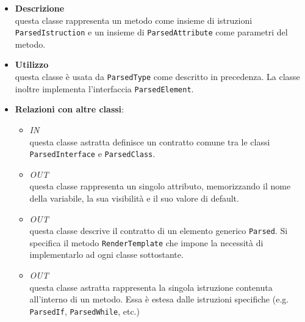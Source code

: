 \label{\nogloxy{swedesigner::server::project::ParsedMethod}}
\begin{itemize}
\item \textbf{Descrizione}\\
questa classe rappresenta un metodo come insieme di istruzioni \texttt{ParsedIstruction} e un insieme di \texttt{ParsedAttribute} come parametri del metodo.
\item \textbf{Utilizzo}\\
questa classe è usata da \texttt{ParsedType} come descritto in precedenza. La classe inoltre implementa l'interfaccia \texttt{ParsedElement}.
\item \textbf{Relazioni con altre classi}:
\begin{itemize}
\item \textit{IN} \hyperref[\nogloxy{swedesigner::server::project::ParsedType}]{}\\
questa classe astratta definisce un contratto comune tra le classi \texttt{ParsedInterface} e \texttt{ParsedClass}. 
\item \textit{OUT} \hyperref[\nogloxy{swedesigner::server::project::ParsedAttribute}]{}\\
questa classe rappresenta un singolo attributo, memorizzando il nome della variabile, la sua visibilità e il suo valore di default. 
\item \textit{OUT} \hyperref[\nogloxy{swedesigner::server::project::ParsedElement}]{}\\
questa classe descrive il contratto di un elemento generico \texttt{Parsed}. Si specifica il metodo \texttt{RenderTemplate} che impone la necessità di implementarlo ad ogni classe sottostante.
\item \textit{OUT} \hyperref[\nogloxy{swedesigner::server::project::ParsedInstruction}]{}\\
questa classe astratta rappresenta la singola istruzione contenuta all'interno di un metodo. Essa è estesa dalle istruzioni specifiche (e.g. \texttt{ParsedIf}, \texttt{ParsedWhile}, etc.)
\end{itemize}
\end{itemize}


